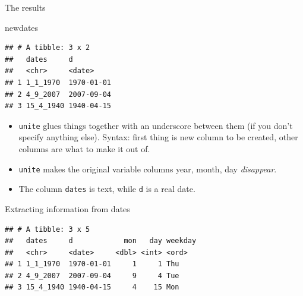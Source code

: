 \documentclass[
  ignorenonframetext,
]{beamer}
\newenvironment{Shaded}{\begin{snugshade}}{\end{snugshade}}
\newcommand{\DataTypeTok}[1]{\textcolor[rgb]{0.13,0.29,0.53}{#1}}
\newcommand{\KeywordTok}[1]{\textcolor[rgb]{0.13,0.29,0.53}{\textbf{#1}}}
\newcommand{\NormalTok}[1]{#1}
\newcommand{\OperatorTok}[1]{\textcolor[rgb]{0.81,0.36,0.00}{\textbf{#1}}}
\newcommand{\StringTok}[1]{\textcolor[rgb]{0.31,0.60,0.02}{#1}}
\providecommand{\tightlist}{%
  \setlength{\itemsep}{0pt}\setlength{\parskip}{0pt}}
\begin{document}
\begin{frame}[fragile]{The results}
\protect\hypertarget{the-results}{}

\begin{Shaded}
\begin{Highlighting}[]
\NormalTok{newdates}
\end{Highlighting}
\end{Shaded}

\begin{verbatim}
## # A tibble: 3 x 2
##   dates     d         
##   <chr>     <date>    
## 1 1_1_1970  1970-01-01
## 2 4_9_2007  2007-09-04
## 3 15_4_1940 1940-04-15
\end{verbatim}

\begin{itemize}
\tightlist
\item
  \texttt{unite} glues things together with an underscore between them
  (if you don't specify anything else). Syntax: first thing is new
  column to be created, other columns are what to make it out of.
\item
  \texttt{unite} makes the original variable columns year, month, day
  \emph{disappear}.
\item
  The column \texttt{dates} is text, while \texttt{d} is a real date.
\end{itemize}

\end{frame}

\begin{frame}[fragile]{Extracting information from dates}
\protect\hypertarget{extracting-information-from-dates}{}

\begin{Shaded}
\end{Shaded}

\begin{verbatim}
## # A tibble: 3 x 5
##   dates     d            mon   day weekday
##   <chr>     <date>     <dbl> <int> <ord>  
## 1 1_1_1970  1970-01-01     1     1 Thu    
## 2 4_9_2007  2007-09-04     9     4 Tue    
## 3 15_4_1940 1940-04-15     4    15 Mon
\end{verbatim}

\end{frame}
\end{document}
